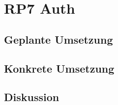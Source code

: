 \section{RP7 Auth}
\label{sec:principle-rp7-auth}



\subsection*{Geplante Umsetzung}


\subsection*{Konkrete Umsetzung}


\subsection*{Diskussion}
